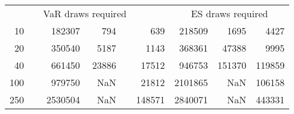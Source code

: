 {{\begin{longtable}{rr rrr r rrr}
\hline 
 && \multicolumn{3}{c}{VaR draws required} &&   \multicolumn{3}{c}{ES draws required} \\  \cline{3-5}  \cline{7-9} 
10 & & 182307 & 794 & & 639 & 218509 & 1695 & 4427 \\ 
20 & & 350540 & 5187 & & 1143 & 368361 & 47388 & 9995 \\ 
40 & & 661450 & 23886 & & 17512 & 946753 & 151370 & 119859 \\ 
100 & & 979750 & NaN & & 21812 & 2101865 & NaN & 106158 \\ 
250 & & 2530504 & NaN & & 148571 & 2840071 & NaN & 443331 \\ 
\hline 
\end{longtable} 
} 
} 
